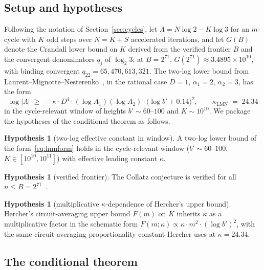 \documentclass[11pt]{amsart}
\theoremstyle{definition}
\newtheorem{hypothesis}[theorem]{Hypothesis}
\theoremstyle{remark}
\begin{document}
\subsection{Setup and hypotheses}
Following the notation of Section~\ref{sec:cycles}, let $\Lambda=N\log 2-K\log 3$ for an
$m$-cycle with $K$ odd steps over $N=K+S$ accelerated iterations, and let $G(B)$ denote the
Crandall lower bound on $K$ derived from the verified frontier $B$ and the convergent
denominators $q_j$ of $\log_2 3$; at $B=2^{71}$, $G(2^{71})\approx 3.4895\times 10^{10}$, with
binding convergent $q_{22}=65{,}470{,}613{,}321$. The two-log lower bound from
Laurent--Mignotte--Nesterenko~\citep{lmn1995}, in the rational case $D=1$, $\alpha_1=2$,
$\alpha_2=3$, has the form
\begin{equation}
   \log|\Lambda|\;\ge\;-\kappa\cdot D^4\cdot (\log A_1)(\log A_2)\cdot \big(\log b'+0.14\big)^2,
   \qquad
   \kappa_{\mathrm{LMN}}\;=\;24.34
   \label{eq:lmnform}
\end{equation}
in the cycle-relevant window of heights $b'\sim 60$--$100$ and $K\sim 10^{10}$. We package the
hypotheses of the conditional theorem as follows.
\begin{hypothesis}[two-log effective constant in window]\label{hyp:H1}
A two-log lower bound of the form~\eqref{eq:lmnform} holds in the cycle-relevant window
($b'\sim 60$--$100$, $K\in[10^{10},10^{11}]$) with effective leading constant $\kappa$.
\end{hypothesis}
\begin{hypothesis}[verified frontier]\label{hyp:H2}
The Collatz conjecture is verified for all $n\le B=2^{71}$~\citep{barina2025}.
\end{hypothesis}
\begin{hypothesis}[multiplicative $\kappa$-dependence of Hercher's upper bound]\label{hyp:H3}
Hercher's circuit-averaging upper bound $F(m)$ on $K$ inherits $\kappa$ as a multiplicative
factor in the schematic form $F(m;\kappa)\propto\kappa\cdot m^2\cdot (\log b')^2$, with the
same circuit-averaging proportionality constant Hercher uses at $\kappa=24.34$.
\end{hypothesis}

\subsection{The conditional theorem}
\end{document}
